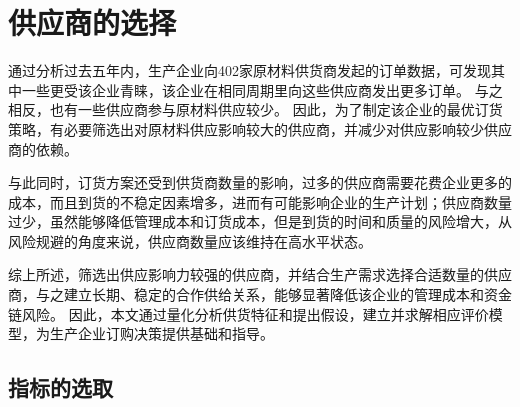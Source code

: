 
\section{供应商的选择}

通过分析过去五年内，生产企业向402家原材料供货商发起的订单数据，可发现其中一些更受该企业青睐，该企业在相同周期里向这些供应商发出更多订单。
与之相反，也有一些供应商参与原材料供应较少。
因此，为了制定该企业的最优订货策略，有必要筛选出对原材料供应影响较大的供应商，并减少对供应影响较少供应商的依赖。

与此同时，订货方案还受到供货商数量的影响，过多的供应商需要花费企业更多的成本，而且到货的不稳定因素增多，进而有可能影响企业的生产计划；供应商数量过少，虽然能够降低管理成本和订货成本，但是到货的时间和质量的风险增大，从风险规避的角度来说，供应商数量应该维持在高水平状态\cite{顾丽娟2014基于最优供应商数量的补货策略研究}。

综上所述，筛选出供应影响力较强的供应商，并结合生产需求选择合适数量的供应商，与之建立长期、稳定的合作供给关系，能够显著降低该企业的管理成本和资金链风险。
因此，本文通过量化分析供货特征和提出假设，建立并求解相应评价模型，为生产企业订购决策提供基础和指导。%



\subsection{指标的选取}

